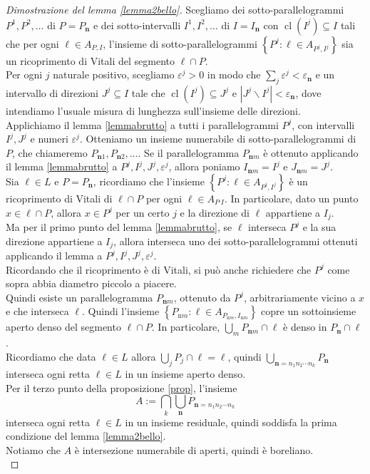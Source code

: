 \documentclass[a4paper, twoside,openright]{article}
\newcommand{\e}{\varepsilon}
\newcommand{\<}{\langle}
\renewcommand{\>}{\rangle}
\begin{document}
\begin{proof}[Dimostrazione del lemma \ref{lemma2bello}]
Scegliamo dei sotto-parallelogrammi $P^{1}, P^{2}, \ldots$ di $P=P_{\mathbf{n}}$ e dei sotto-intervalli $I^{1}, I^{2}, \ldots$ di $I=I_{\mathbf{n}}$ con $\operatorname{cl}(I^j) \subseteq I$ tali che per ogni $\ell \in A_{P, I}$, l'insieme di sotto-parallelogrammi $\left\{P^{j}: \ell \in A_{P^{j}, I^{j}}\right\}$
sia un ricoprimento di Vitali del segmento $\ell \cap P$. \\
Per ogni $j$ naturale positivo, scegliamo  $\varepsilon^{j} >0$ in modo che $\sum_j \e^j < \e_{\mathbf{n}}$ e un intervallo di direzioni $J^{j} \subseteq I$ tale che $\operatorname{cl}\left(I^{j}\right) \subseteq J^{j}$ e $\left|J^{j} \backslash I^{j}\right|<\varepsilon_\mathbf{n}$, dove intendiamo l'usuale misura di lunghezza sull'insieme delle direzioni.\\ 
Applichiamo il lemma \ref{lemmabrutto} a tutti i parallelogrammi $P^{j}$, con intervalli $I^{j}, J^{j}$ e numeri $\varepsilon^{j}$. Otteniamo un insieme numerabile di sotto-parallelogrammi di $P$, che chiameremo $P_{\mathbf{n} 1}, P_{\mathbf{n} 2}, \ldots$. Se il parallelogramma $P_{\mathbf{n} m}$ è ottenuto applicando il lemma \ref{lemmabrutto} a $P^{j}, I^{j}, J^{j}, \varepsilon^{j}$, allora poniamo $I_{\mathbf{n} m}=I^{j}$ e $J_{\mathbf{n} m}=J^{j}$.\\

Sia $\ell \in L$ e $P=P_{\mathbf{n}}$, ricordiamo che l'insieme $\left\{P^{j}: \ell \in A_{P^{j}, I^{j}}\right\}$ è un ricoprimento di Vitali di $\ell \cap P$ per ogni $\ell \in A_{P^, I}$. In particolare, dato un punto $x \in \ell \cap P$, allora $x \in P^j$ per un certo $j$ e la direzione di $\ell$ appartiene a $I_j$.\\
Ma per il primo punto del lemma \ref{lemmabrutto}, se $\ell$ interseca $P^j$ e la sua direzione appartiene a $I_j$, allora interseca uno dei sotto-parallelogrammi ottenuti applicando il lemma a $P^{j}, I^{j}, J^{j}, \varepsilon^{j}$.\\
Ricordando che il ricoprimento è di Vitali, si può anche richiedere che $P^j$ come sopra abbia diametro piccolo a piacere.\\
Quindi esiste un parallelogramma $P_{\mathbf{n}m}$, ottenuto da $P^j$, arbitrariamente vicino a $x$ e che interseca $\ell$. Quindi l'insieme $\left\{P_{\mathrm{n} m}: \ell \in A_{P_{\mathrm{n}m}, I_{\mathrm{n} m}}\right\}$
copre un sottoinsieme aperto denso del segmento $\ell \cap P$. In particolare, $\bigcup_m P_{\mathbf{n}m} \cap \ell$ è denso in $P_\mathbf{n} \cap \ell$.\\
Ricordiamo che data $\ell \in L$ allora $ \bigcup_j P_j \cap \ell = \ell $, quindi $\bigcup_{\mathbf{n}=n_{1} n_{2} \cdots n_{k}} P_{\mathbf{n}}$ interseca ogni retta $\ell \in L$ in un insieme aperto denso.\\
Per il terzo punto della proposizione \ref{prop}, l'insieme 
$$
A:= \bigcap_{k} \bigcup_{\mathbf{n}} P_{\mathbf{n}=n_{1} n_{2} \cdots n_{k}}
$$
interseca ogni retta $\ell \in L$ in un insieme residuale, quindi soddisfa la prima condizione del lemma \ref{lemma2bello}.\\
Notiamo che $A$ è intersezione numerabile di aperti, quindi è boreliano.\\


\end{proof}
\end{document}
